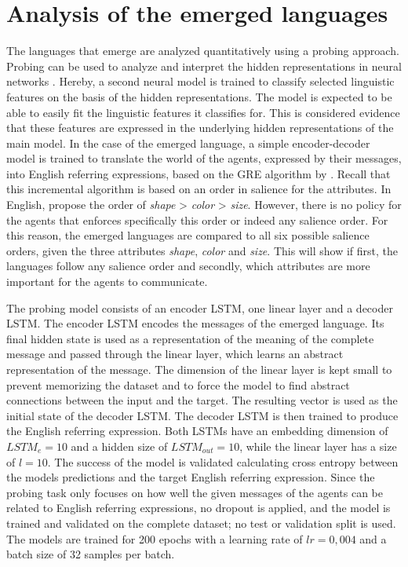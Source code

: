 \section{Analysis of the emerged languages}
\label{sec:analysis_language}
The languages that emerge are analyzed quantitatively using a probing approach.
Probing can be used to analyze and interpret the hidden representations in neural networks \citep{Conneau2018}.
Hereby, a second neural model is trained to classify selected linguistic features on the basis of the hidden representations.
The model is expected to be able to easily fit the linguistic features it classifies for.
This is considered evidence that these features are expressed in the underlying hidden representations of the main model.
In the case of the emerged language, a simple encoder-decoder model is trained to translate the world of the agents, expressed by their messages, into English referring expressions, based on the GRE algorithm by \citet{Dale1995}.
Recall that this incremental algorithm is based on an order in salience for the attributes.
In English, \citet{Dale1995} propose the order of \emph{shape} > \emph{color} > \emph{size}.
However, there is no policy for the agents that enforces specifically this order or indeed any salience order.
For this reason, the emerged languages are compared to all six possible salience orders, given the three attributes \emph{shape}, \emph{color} and \emph{size}.
This will show if first, the languages follow any salience order and secondly, which attributes are more important for the agents to communicate.

The probing model consists of an encoder LSTM, one linear layer and a decoder LSTM.
The encoder LSTM encodes the messages of the emerged language.
Its final hidden state is used as a representation of the meaning of the complete message and passed through the linear layer, which learns an abstract representation of the message.
The dimension of the linear layer is kept small to prevent memorizing the dataset and to force the model to find abstract connections between the input and the target.
The resulting vector is used as the initial state of the decoder LSTM.
The decoder LSTM is then trained to produce the English referring expression.
Both LSTMs have an embedding dimension of $LSTM_e=10$ and a hidden size of $LSTM_{out}=10$, while the linear layer has a size of $l=10$.
The success of the model is validated calculating cross entropy between the models predictions and the target English referring expression.
Since the probing task only focuses on how well the given messages of the agents can be related to English referring expressions, no dropout is applied, and the model is trained and validated on the complete dataset; no test or validation split is used.
The models are trained for 200 epochs with a learning rate of $lr=0,004$ and a batch size of 32 samples per batch.

